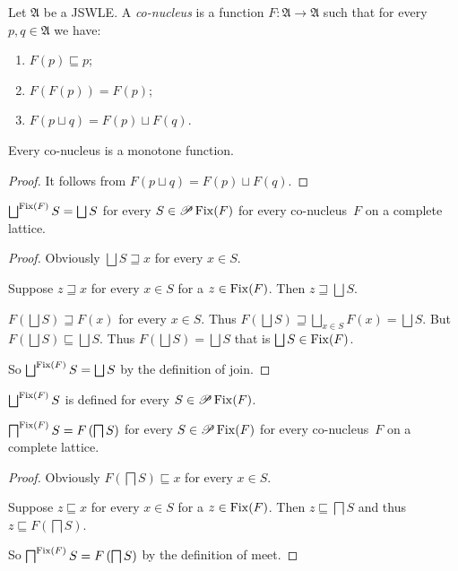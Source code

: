\begin{defn}
Let $\mathfrak{A}$ be a JSWLE. A \emph{co-nucleus} is a function
$F:\mathfrak{A}\rightarrow\mathfrak{A}$ such that for every $p,q\in\mathfrak{A}$
we have:
\begin{enumerate}
\item \label{co-nucleus-less}$F(p)\sqsubseteq p$;
\item $F(F(p))=F(p)$;
\item $F(p\sqcup q)=F(p)\sqcup F(q)$.
\end{enumerate}
\end{defn}
\begin{prop}
Every co-nucleus is a monotone function.\end{prop}
\begin{proof}
It follows from $F(p\sqcup q)=F(p)\sqcup F(q)$.\end{proof}
\begin{lem}
$\bigsqcup^{\Fix(F)}S=\bigsqcup S$ for every $S\in\mathscr{P}\operatorname{Fix}(F)$
for every co-nucleus~$F$ on a complete lattice.\end{lem}
\begin{proof}
Obviously $\bigsqcup S\sqsupseteq x$ for every $x\in S$.

Suppose $z\sqsupseteq x$ for every $x\in S$ for a $z\in\operatorname{Fix}(F)$.
Then $z\sqsupseteq\bigsqcup S$.

$F\left(\bigsqcup S\right)\sqsupseteq F(x)$ for every $x\in S$.
Thus $F\left(\bigsqcup S\right)\sqsupseteq\bigsqcup_{x\in S}F(x)=\bigsqcup S$.
But $F\left(\bigsqcup S\right)\sqsubseteq\bigsqcup S$. Thus $F\left(\bigsqcup S\right)=\bigsqcup S$
that is $\bigsqcup S\in\Fix(F)$.

So $\bigsqcup^{\Fix(F)}S=\bigsqcup S$ by the definition of join.\end{proof}
\begin{cor}
$\bigsqcup^{\Fix(F)}S$ is defined for every $S\in\mathscr{P}\operatorname{Fix}(F)$.\end{cor}
\begin{lem}
$\bigsqcap^{\operatorname{Fix}(F)}S=F\left(\bigsqcap S\right)$ for every $S\in\mathscr{P}\operatorname{Fix}(F)$
for every co-nucleus~$F$ on a complete lattice.\end{lem}
\begin{proof}
Obviously $F\left(\bigsqcap S\right)\sqsubseteq x$ for every $x\in S$.

Suppose $z\sqsubseteq x$ for every $x\in S$ for a $z\in\operatorname{Fix}(F)$.
Then $z\sqsubseteq\bigsqcap S$ and thus $z\sqsubseteq F\left(\bigsqcap S\right)$.

So $\bigsqcap^{\operatorname{Fix}(F)}S=F\left(\bigsqcap S\right)$ by the definition
of meet.\end{proof}
